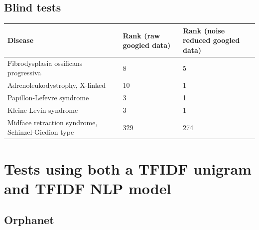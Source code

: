 \documentclass[10pt,letterpaper,final]{article}
\begin{document}
\subsection{Blind tests}

\begin{center}
\begin{small}
	\begin{tabular}{|p{3.5cm}|p{1.8cm}|p{1.8cm}|}
	\hline
	\textbf{Disease}  & \textbf{Rank (raw googled data)} & \textbf{Rank (noise reduced googled data)} \\
	\hline\hline
    Fibrodysplasia ossificans progressiva & 8 & 5\\    \hline
    Adrenoleukodystrophy, X-linked & 10 & 1 \\    \hline
    Papillon-Lefevre syndrome & 3 & 1\\    \hline
    Kleine-Levin syndrome  & 3 & 1\\    \hline
    Midface retraction syndrome, Schinzel-Giedion type  & 329 & 274\\    \hline
	\end{tabular}
\label{tab:results_blindtest}
\end{small}
\end{center}




\newpage
\section{Tests using both a TFIDF unigram and TFIDF NLP model}

\subsection{Orphanet}
\end{document}
